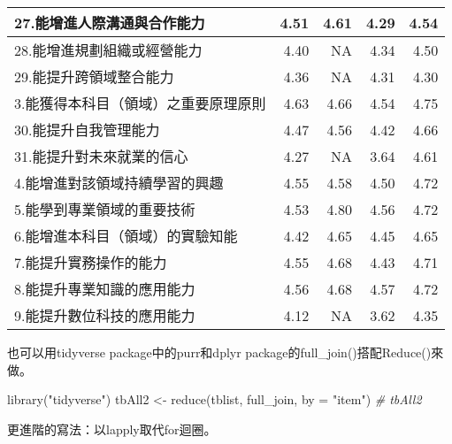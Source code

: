 \documentclass[
]{book}
\newenvironment{Shaded}{\begin{snugshade}}{\end{snugshade}}
\newcommand{\AttributeTok}[1]{\textcolor[rgb]{0.77,0.63,0.00}{#1}}
\newcommand{\CommentTok}[1]{\textcolor[rgb]{0.56,0.35,0.01}{\textit{#1}}}
\newcommand{\FunctionTok}[1]{\textcolor[rgb]{0.00,0.00,0.00}{#1}}
\newcommand{\NormalTok}[1]{#1}
\newcommand{\OtherTok}[1]{\textcolor[rgb]{0.56,0.35,0.01}{#1}}
\newcommand{\StringTok}[1]{\textcolor[rgb]{0.31,0.60,0.02}{#1}}
\begin{document}
\begin{tabular}{l|r|r|r|r}
\hline
27.能增進人際溝通與合作能力 & 4.51 & 4.61 & 4.29 & 4.54\\
\hline
28.能增進規劃組織或經營能力 & 4.40 & NA & 4.34 & 4.50\\
\hline
29.能提升跨領域整合能力 & 4.36 & NA & 4.31 & 4.30\\
\hline
3.能獲得本科目（領域）之重要原理原則 & 4.63 & 4.66 & 4.54 & 4.75\\
\hline
30.能提升自我管理能力 & 4.47 & 4.56 & 4.42 & 4.66\\
\hline
31.能提升對未來就業的信心 & 4.27 & NA & 3.64 & 4.61\\
\hline
4.能增進對該領域持續學習的興趣 & 4.55 & 4.58 & 4.50 & 4.72\\
\hline
5.能學到專業領域的重要技術 & 4.53 & 4.80 & 4.56 & 4.72\\
\hline
6.能增進本科目（領域）的實驗知能 & 4.42 & 4.65 & 4.45 & 4.65\\
\hline
7.能提升實務操作的能力 & 4.55 & 4.68 & 4.43 & 4.71\\
\hline
8.能提升專業知識的應用能力 & 4.56 & 4.68 & 4.57 & 4.72\\
\hline
9.能提升數位科技的應用能力 & 4.12 & NA & 3.62 & 4.35\\
\hline
\end{tabular}

也可以用tidyverse package中的purr和dplyr package的full\_join()搭配Reduce()來做。

\begin{Shaded}
\begin{Highlighting}[]
\FunctionTok{library}\NormalTok{(}\StringTok{"tidyverse"}\NormalTok{)}
\NormalTok{tbAll2 }\OtherTok{\textless{}{-}} \FunctionTok{reduce}\NormalTok{(tblist, full\_join, }\AttributeTok{by =} \StringTok{"item"}\NormalTok{)}
\CommentTok{\# tbAll2}
\end{Highlighting}
\end{Shaded}

更進階的寫法：以lapply取代for迴圈。
\end{document}

